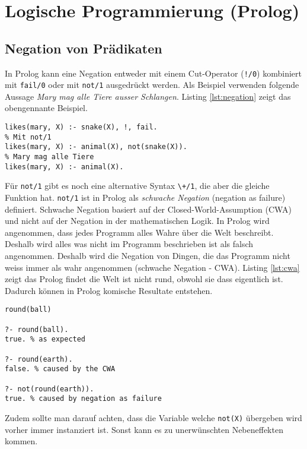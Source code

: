 \chapter{Logische Programmierung (Prolog)}

\section{Negation von Prädikaten}

In Prolog kann eine Negation entweder mit einem Cut-Operator (\verb|!/0|) kombiniert mit \verb|fail/0| oder mit \verb|not/1| ausgedrückt werden. Als Beispiel verwenden folgende Aussage \textit{Mary mag alle Tiere ausser Schlangen}. Listing \ref{lst:negation} zeigt das obengennante Beispiel.

\begin{lstlisting}[caption=Negation, label=lst:negation]
% Wenn X eine Schlange unterbreche Backtracking und Regel ist falsch
likes(mary, X) :- snake(X), !, fail.
% Mit not/1
likes(mary, X) :- animal(X), not(snake(X)).
% Mary mag alle Tiere
likes(mary, X) :- animal(X).
\end{lstlisting}

Für \verb|not/1| gibt es noch eine alternative Syntax \verb|\+/1|, die aber die gleiche Funktion hat. \verb|not/1| ist in Prolog als \textit{schwache Negation} (negation as failure) definiert. Schwache Negation basiert auf der Closed-World-Assumption (CWA) und nicht auf der Negation in der mathematischen Logik. In Prolog wird angenommen, dass jedes Programm alles Wahre über die Welt beschreibt. Deshalb wird alles was nicht im Programm beschrieben ist als falsch angenommen. Deshalb wird die Negation von Dingen, die das Programm nicht weiss immer als wahr angenommen (schwache Negation - CWA). Listing \ref{lst:cwa} zeigt das Prolog findet die Welt ist nicht rund, obwohl sie dass eigentlich ist. Dadurch können in Prolog komische Resultate entstehen.

\begin{lstlisting}[caption=CWA, label=lst:cwa]
round(ball)

?- round(ball).
true. % as expected

?- round(earth).
false. % caused by the CWA

?- not(round(earth)).
true. % caused by negation as failure
\end{lstlisting}

Zudem sollte man darauf achten, dass die Variable welche \verb|not(X)| übergeben wird vorher immer instanziert ist. Sonst kann es zu unerwünschten Nebeneffekten kommen.

